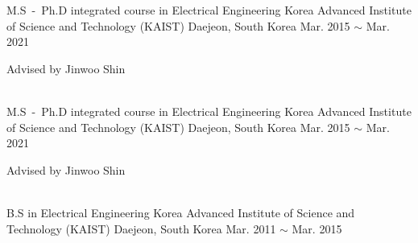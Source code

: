 

\begin{cventries}

    \cventry
    {M.S~-~Ph.D integrated course in Electrical Engineering}
    {Korea Advanced Institute of Science and Technology (KAIST)}
    {Daejeon, South Korea}
    {Mar. 2015 $\sim$ Mar. 2021}
    {\begin{cvitems}\item{Advised by Jinwoo Shin}\end{cvitems}}
    \vspace{.1in}
    \\
    \cventry
    {M.S~-~Ph.D integrated course in Electrical Engineering}
    {Korea Advanced Institute of Science and Technology (KAIST)}
    {Daejeon, South Korea}
    {Mar. 2015 $\sim$ Mar. 2021}
    {\begin{cvitems}\item{Advised by Jinwoo Shin}\end{cvitems}}
    \vspace{.1in}
    \\
    \cventryshort
    {B.S in Electrical Engineering}
    {Korea Advanced Institute of Science and Technology (KAIST)}
    {Daejeon, South Korea}
    {Mar. 2011 $\sim$ Mar. 2015}
    {}
\end{cventries}
